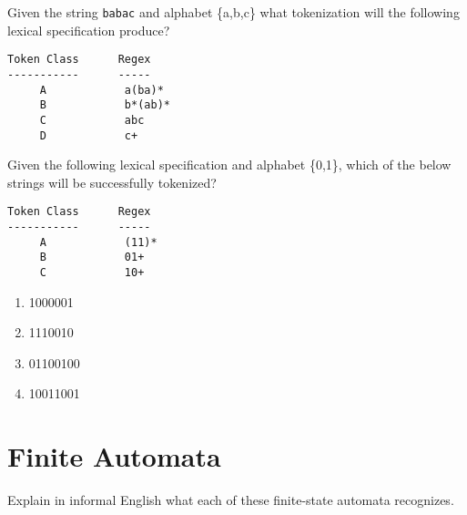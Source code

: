 \documentclass[11pt, oneside]{exam}
\begin{document}
\begin{questions}
\question[3]
Given the string {\tt babac} and alphabet \{a,b,c\} what tokenization will the following lexical specification produce?
\begin{verbatim}
Token Class      Regex
-----------      -----
     A            a(ba)*
     B            b*(ab)*
     C            abc
     D            c+
\end{verbatim}
{\tt <B, bab>}

\question[6]
Given the following lexical specification and alphabet \{0,1\}, which of the below strings will be successfully tokenized?
\begin{verbatim}
Token Class      Regex
-----------      -----
     A            (11)*
     B            01+
     C            10+
\end{verbatim}
\begin{enumerate}
\item 1000001 \checkmark
\item 1110010 \checkmark
\item 01100100 \checkmark
\item 10011001 \checkmark
\end{enumerate}

\section*{Finite Automata}

\question
Explain in informal English what each of these finite-state automata recognizes.

\end{questions}
\end{document}
